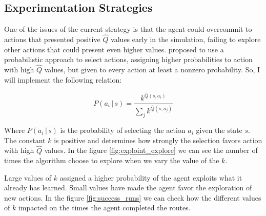 \documentclass[a4paper]{article}
\begin{document}
\subsection{Experimentation Strategies}
One of the issues of the current strategy is that the agent could overcommit to actions that presented positive $\hat{Q}$ values early in the simulation, failing to explore other actions that could present even higher values. \cite{Mitchell} proposed to use a probabilistic approach to select actions, assigning higher probabilities to action with high $\hat{Q}$ values, but given to every action at least a nonzero probability. So, I will implement the following relation:

$$P(a_i\, | \,s ) = \frac{k ^{\hat{Q}(s, a_i)}}{\sum_j k^{\hat{Q}(s, a_j)}}$$

Where $P(a_i\, | \,s )$ is the probability of selecting the action $a_i$ given the state $s$. The constant $k$ is positive and determines how strongly the selection favors action with high $\hat{Q}$ values. In the figure \ref{fig:exploint_explore} we can see the number of times the algorithm choose to explore when we vary the value of the $k$.

Large values of $k$ assigned a higher probability of the agent exploits what it already has learned. Small values have made the agent favor the exploration of new actions. In the figure \ref{fig:success_runs} we can check how the different values of $k$ impacted on the times the agent completed the routes.
\end{document}
